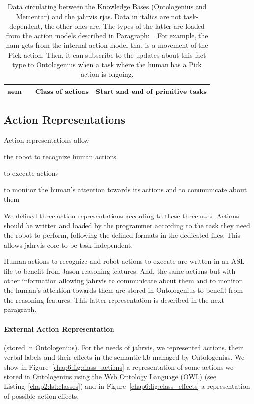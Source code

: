 \documentclass[a4paper,11pt,twoside]{StyleThese}
\begin{document}
\begin{landscape}
\begin{table}[]
\begin{tabular}{p{}||p{}|p{}|p{}|}
		\acrlong{aem} &
		&
		Class of actions &
		Start and end of primitive tasks \\ \hline
		
	\end{tabular}
	\caption{Data circulating between the Knowledge Bases (Ontologenius and Mementar) and the \acrshort{jahrvis} \acrshort{rja}s. Data in italics are not task-dependent, the other ones are. The types of the latter are loaded from the action models described in Paragraph:~. For example, the \acrlong{ham} gets from the internal action model that  is a movement of the Pick action. Then, it can subscribe to the updates about this fact type to Ontologenius when a task where the human has a Pick action is ongoing.}
	\label{chap6:tab:data}
\end{table}
\end{landscape}

\subsection{Action Representations}\label{chap6:subsec:action_rep}
Action representations allow 
\begin{bulletList}
	\item the robot to recognize human actions
	\item to execute actions
	\item to monitor the human's attention towards its actions and to communicate about them
\end{bulletList} 

We defined three action representations according to these three uses. Actions should be written and loaded by the programmer according to the task they need the robot to perform, following the defined formats in the dedicated files. This allows \acrshort{jahrvis} core to be task-independent.

Human actions to recognize and robot actions to execute are written in an ASL file to benefit from Jason reasoning features. And, the same actions but with other information allowing \acrshort{jahrvis} to communicate about them and to monitor the human's attention towards them are stored in Ontologenius to benefit from the reasoning features. This latter representation is described in the next paragraph.

\paragraph{External Action Representation} (\ie stored in Ontologenius).
For the needs of \acrshort{jahrvis}, we represented actions, their verbal labels and their effects in the semantic \acrshort{kb} managed by Ontologenius. We show in Figure~\ref{chap6:fig:class_actions} a representation of some actions we stored in Ontologenius using the Web Ontology Language (OWL) (see Listing~\ref{chap2:lst:classes}) and in Figure~\ref{chap6:fig:class_effects} a representation of possible action effects.
\end{document}

